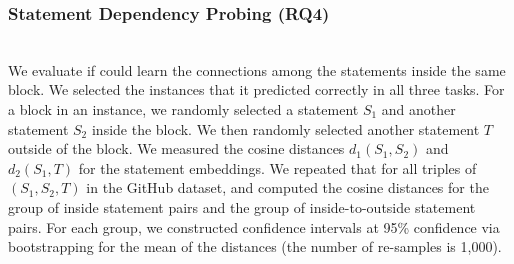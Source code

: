 \vspace{2pt}
\subsubsection{Statement Dependency Probing (RQ4)}~\\
We evaluate if {\tool} could learn the connections
among the statements inside the same  block. We
selected the instances that it predicted correctly in all three
tasks. For a  block in an instance, we randomly
selected a statement $S_1$ and another statement $S_2$ inside the
block. We then randomly selected another statement $T$ outside of the
block. We measured the cosine distances $d_1(S_1,S_2)$ and $d_2(S_1,T)$
for the statement embeddings. We repeated that for all triples
of $(S_1,S_2,T)$ in the GitHub dataset, and computed the cosine
distances for the group of inside statement pairs and the group of
inside-to-outside statement pairs. For each group, we constructed
confidence intervals at 95\% confidence via bootstrapping for the mean
of the distances (the number of re-samples is 1,000).
